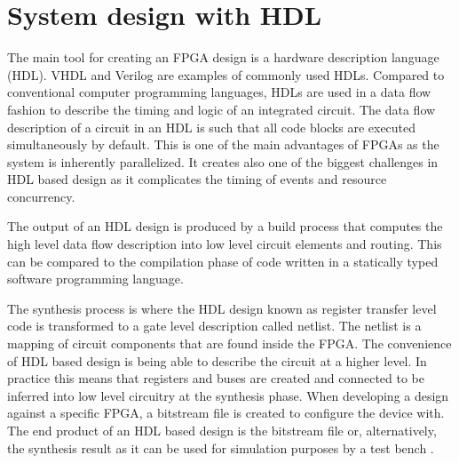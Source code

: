 \documentclass[12pt]{report}
\begin{document}
\section{System design with HDL}
The main tool for creating an FPGA design is a hardware description language (HDL). VHDL and Verilog are examples of commonly used HDLs. Compared to conventional computer programming languages, HDLs are used in a data flow fashion to describe the timing and logic of an integrated circuit. The data flow description of a circuit in an HDL is such that all code blocks are executed simultaneously by default. This is one of the main advantages of FPGAs as the system is inherently parallelized. It creates also one of the biggest challenges in HDL based design as it complicates the timing of events and resource concurrency.
\par
The output of an HDL design is produced by a build process that computes the high level data flow description into low level circuit elements and routing. This can be compared to the compilation phase of code written in a statically typed software programming language. 
\par
The synthesis process is where the HDL design known as register transfer level code is transformed to a gate level description called netlist. The netlist is a mapping of circuit components that are found inside the FPGA. The convenience of HDL based design is being able to describe the circuit at a higher level. In practice this means that registers and buses are created and connected to be inferred into low level circuitry at the synthesis phase. When developing a design against a specific FPGA, a bitstream file is created to configure the device with. The end product of an HDL based design is the bitstream file or, alternatively, the synthesis result as it can be used for simulation purposes by a test bench \citep{XilVivado}.
\end{document}
